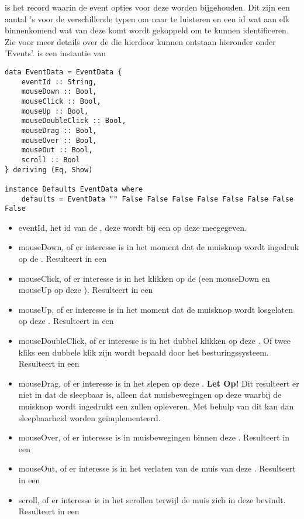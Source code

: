  is het record waarin de event opties voor deze \shape worden bijgehouden. Dit zijn een aantal 's voor de verschillende typen \events om naar te luisteren en een id wat aan elk binnenkomend  wat van deze \shape komt wordt gekoppeld om te kunnen identificeren.
Zie voor meer details over de \events die hierdoor kunnen ontstaan hieronder onder 'Events'.
 is een instantie van 

\begin{lstlisting}
data EventData = EventData {
    eventId :: String,
    mouseDown :: Bool,
    mouseClick :: Bool,
    mouseUp :: Bool,
    mouseDoubleClick :: Bool,
    mouseDrag :: Bool,
    mouseOver :: Bool,
    mouseOut :: Bool,
    scroll :: Bool
} deriving (Eq, Show)

instance Defaults EventData where
    defaults = EventData "" False False False False False False False False
\end{lstlisting} 
\begin{itemize}
	\item eventId, het id van de \shape, deze wordt bij een  op deze \shape meegegeven. 
	\item mouseDown, of er interesse is in het moment dat de muisknop wordt ingedruk op de \shape. Resulteert in een  
	\item mouseClick, of er interesse is in het klikken op de \shape (een mouseDown en mouseUp op deze \shape). Resulteert in een 
	\item mouseUp, of er interesse is in het moment dat de muisknop wordt losgelaten op deze \shape. Resulteert in een 
	\item mouseDoubleClick, of er interesse is in het dubbel klikken op deze \shape. Of twee kliks een dubbele klik zijn wordt bepaald door het besturingssysteem. Resulteert in een 
	\item mouseDrag, of er interesse is in het slepen op deze \shape. {\bf Let Op!} Dit resulteert er niet in dat de \shape sleepbaar is, alleen dat muisbewegingen op deze \shape waarbij de muisknop wordt ingedrukt een  zullen opleveren. Met behulp van dit  kan dan sleepbaarheid worden geïmplementeerd.
	\item mouseOver, of er interesse is in muisbewegingen binnen deze \shape. Resulteert in een 
	\item mouseOut, of er interesse is in het verlaten van de muis van deze \shape. Resulteert in een 
	\item scroll, of er interesse is in het scrollen terwijl de muis zich in deze \shape bevindt. Resulteert in een 	
\end{itemize}

